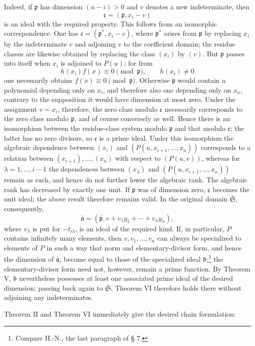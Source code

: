 \documentclass[11pt]{article}
\providecommand{\frakS}{\mathfrak S}
\providecommand{\frakp}{\mathfrak p}
\providecommand{\fraka}{\mathfrak a}
\providecommand{\frakb}{\mathfrak b}
\providecommand{\frakc}{\mathfrak c}
\begin{document}
Indeed, if $\frakp$ has dimension $(n-i)>0$ and $v$ denotes a new indeterminate, then
\[
 \frakc=(\frakp,x_i-v)
\]
is an ideal with the required property. This follows from an isomorphic correspondence. One has $\frakc=(\frakp^*,x_i-v)$, where $\frakp^*$ arises from $\frakp$ by replacing $x_i$ by the indeterminate $v$ and adjoining $v$ to the coefficient domain; the residue classes are likewise obtained by replacing the class $(x_i)$ by $(v)$. But $\frakp$ passes into itself when $x_i$ is adjoined to $P(u)$; for from
\[
 h(x_i)f(x)\equiv0\pmod{\frakp},\qquad h(x_i)\ne0
\]
one necessarily obtains $f(x)\equiv0\pmod{\frakp}$. Otherwise $\frakp$ would contain a polynomial depending only on $x_i$, and therefore also one depending only on $x_n$, contrary to the supposition it would have dimension at most zero. Under the assignment $v\sim x_i$, therefore, the zero class modulo $\frakc$ necessarily corresponds to the zero class modulo $\frakp$, and of course conversely as well. Hence there is an isomorphism between the residue-class system modulo $\frakp$ and that modulo $\frakc$; the latter has no zero divisors, so $\frakc$ is a prime ideal. Under this isomorphism the algebraic dependence between $(x_i)$ and $(P(u,x_{i+1},\ldots,x_n))$ corresponds to a relation between $(x_{i+1}),\ldots,(x_n)$ with respect to $(P(u,v))$, whereas for $\lambda=1,\ldots,i-1$ the dependences between $(x_\lambda)$ and $(P(u,x_{i+1},\ldots,x_n))$ remain as such, and hence do not further lower the algebraic rank. The algebraic rank has decreased by exactly one unit. If $\frakp$ was of dimension zero, $\frakc$ becomes the unit ideal; the above result therefore remains valid. In the original domain $\bar{\frakS}$, consequently,
\[
 \bar{\fraka}=(\bar{\frakp},v+v_1y_1+\cdots+v_ny_n),
\]
where $v_\lambda$ is put for $-t_{i\lambda}$, is an ideal of the required kind. If, in particular, $P$ contains infinitely many elements, then $v,v_1,\ldots,v_n$ can always be specialized to elements of $P$ in such a way that norm and elementary-divisor form, and hence the dimension of $\bar{\fraka}$, become equal to those of the specialized ideal $\frakb$;\footnote{Compare H.-N., the last paragraph of § 7.} the elementary-divisor form need not, however, remain a prime function. By Theorem V, $\frakb$ nevertheless possesses at least one associated prime ideal of the desired dimension; passing back again to $\bar{\frakS}$, Theorem VI therefore holds there without adjoining any indeterminates.

Theorem II and Theorem VI immediately give the desired chain formulation:
\end{document}
